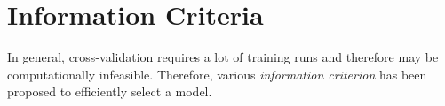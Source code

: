 \section{Information Criteria}

  In general, cross-validation requires a lot of training runs and therefore may be computationally infeasible. Therefore, various \textit{information criterion} has been proposed to efficiently select a model. 

